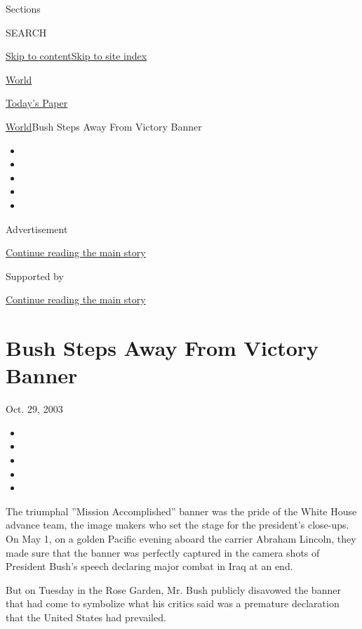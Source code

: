 Sections

SEARCH

\protect\hyperlink{site-content}{Skip to
content}\protect\hyperlink{site-index}{Skip to site index}

\href{https://www.nytimes.com/section/world}{World}

\href{https://myaccount.nytimes.com/auth/login?response_type=cookie\&client_id=vi}{}

\href{https://www.nytimes.com/section/todayspaper}{Today's Paper}

\href{/section/world}{World}\textbar{}Bush Steps Away From Victory
Banner

\begin{itemize}
\item
\item
\item
\item
\item
\end{itemize}

Advertisement

\protect\hyperlink{after-top}{Continue reading the main story}

Supported by

\protect\hyperlink{after-sponsor}{Continue reading the main story}

\hypertarget{bush-steps-away-from-victory-banner}{%
\section{Bush Steps Away From Victory
Banner}\label{bush-steps-away-from-victory-banner}}

Oct. 29, 2003

\begin{itemize}
\item
\item
\item
\item
\item
\end{itemize}

The triumphal ''Mission Accomplished'' banner was the pride of the White
House advance team, the image makers who set the stage for the
president's close-ups. On May 1, on a golden Pacific evening aboard the
carrier Abraham Lincoln, they made sure that the banner was perfectly
captured in the camera shots of President Bush's speech declaring major
combat in Iraq at an end.

But on Tuesday in the Rose Garden, Mr. Bush publicly disavowed the
banner that had come to symbolize what his critics said was a premature
declaration that the United States had prevailed.

